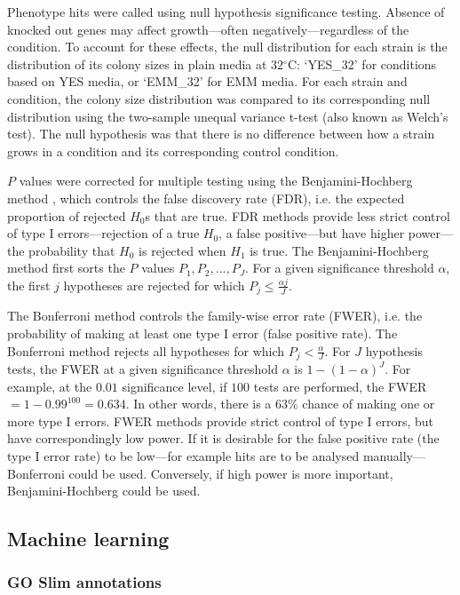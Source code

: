 Phenotype hits were called using null hypothesis significance testing. Absence of knocked out genes may affect growth---often negatively---regardless of the condition. To account for these effects, the null distribution for each strain is the distribution of its colony sizes in plain media at $32$$^{\circ}$C: `YES\_32' for conditions based on YES media, or `EMM\_32' for EMM media. For each strain and condition, the colony size distribution was compared to its corresponding null distribution using the two-sample unequal variance t-test (also known as Welch's test). The null hypothesis was that there is no difference between how a strain grows in a condition and its corresponding control condition.

$P$ values were corrected for multiple testing using the Benjamini-Hochberg method \cite{Benjamini1995}, which controls the false discovery rate (FDR), i.e. the expected proportion of rejected $H_0$s that are true. FDR methods provide less strict control of type I errors---rejection of a true $H_0$, a false positive---but have higher power---the probability that $H_0$ is rejected when $H_1$ is true. The Benjamini-Hochberg method first sorts the $P$ values $P_1, P_2, ..., P_J$. For a given significance threshold $\alpha$, the first $j$ hypotheses are rejected for which $P_j \le \frac{\alpha j}{J}$.

The Bonferroni method \cite{Dunn1961,Dunn1959} controls the family-wise error rate (FWER), i.e. the probability of making at least one type I error (false positive rate). The Bonferroni method rejects all hypotheses for which $P_j < \frac{\alpha}{J}$. For $J$ hypothesis tests, the FWER at a given significance threshold $\alpha$ is $1-(1-\alpha)^J$. For example, at the $0.01$ significance level, if $100$ tests are performed, the FWER $= 1-0.99^{100} = 0.634$. In other words, there is a $63\%$ chance of making one or more type I errors. FWER methods provide strict control of type I errors, but have correspondingly low power. If it is desirable for the false positive rate (the type I error rate) to be low---for example hits are to be analysed manually---Bonferroni could be used. Conversely, if high power is more important, Benjamini-Hochberg could be used.

\subsection{Machine learning}

\subsubsection{GO Slim annotations}

